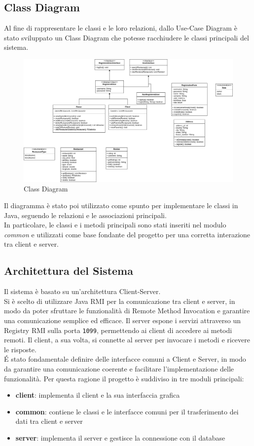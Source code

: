 \subsection{Class Diagram}
Al fine di rappresentare le classi e le loro relazioni, dallo 
Use-Case Diagram è stato sviluppato un Class Diagram che potesse 
racchiudere le classi principali del sistema.
\begin{figure}[H]
  \centering
  \includegraphics[width=\textwidth]{images/UML-Class-Diagram.png}
  \caption{Class Diagram}
  \label{fig:class-diagram}
\end{figure}
Il diagramma è stato poi utilizzato come spunto 
per implementare le classi in Java, 
seguendo le relazioni e le associazioni principali.\\
In particolare, le classi e i metodi principali sono stati inseriti 
nel modulo \textit{common} e utilizzati come base fondante del progetto 
per una corretta interazione tra client e server.

\subsection{Architettura del Sistema}
Il sistema è basato su un'architettura Client-Server.\\
Si è scelto di utilizzare Java RMI per la comunicazione tra client e server,
in modo da poter sfruttare le funzionalità di Remote Method Invocation 
e garantire una comunicazione semplice ed efficace.
Il server espone i servizi attraverso un Registry RMI sulla porta 
\texttt{1099}, permettendo ai client di accedere ai metodi remoti.
Il client, a sua volta, si connette al server per invocare i metodi
e ricevere le risposte.\\

\'E stato fondamentale definire delle interfacce comuni a Client 
e Server, in modo da garantire una comunicazione coerente e
facilitare l'implementazione delle funzionalità.
Per questa ragione il progetto è suddiviso in tre moduli principali:
\begin{itemize}
  \item \textbf{client}: implementa il client e la sua interfaccia grafica
  \item \textbf{common}: contiene le classi e le interfacce comuni per il trasferimento dei dati tra client e server
  \item \textbf{server}: implementa il server e gestisce la connessione con il database
\end{itemize}

